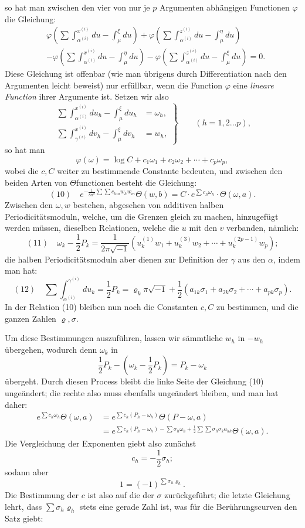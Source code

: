 \documentclass[10pt]{article}
\begin{document}
so hat man zwischen den vier von nur je \(p\) Argumenten abhängigen Functionen \(\varphi\) die Gleichung:
\[
\begin{aligned}
&\varphi\!\left(\sum\int_{\alpha^{(i)}}^{x^{(i)}}du-\int_{\mu}^{\xi}du\right)
+\varphi\!\left(\sum\int_{\alpha^{(i)}}^{z^{(i)}}du-\int_{\mu}^{\eta}du\right)\\
&-\varphi\!\left(\sum\int_{\alpha^{(i)}}^{x^{(i)}}du-\int_{\mu}^{\eta}du\right)
-\varphi\!\left(\sum\int_{\alpha^{(i)}}^{z^{(i)}}du-\int_{\mu}^{\xi}du\right)=0.
\end{aligned}
\]
Diese Gleichung ist offenbar (wie man übrigens durch Differentiation nach den Argumenten leicht beweist) nur erfüllbar, wenn die Function \(\varphi\) eine \emph{lineare Function} ihrer Argumente ist. Setzen wir also
\[
\left.
\begin{aligned}
\sum\int_{\alpha^{(i)}}^{x^{(i)}}du_h-\int_{\mu}^{\xi}du_h&=\omega_h,\\
\sum\int_{\gamma^{(i)}}^{x^{(i)}}dv_h-\int_{\mu}^{\xi}dv_h&=w_h,
\end{aligned}
\right\}
\qquad (h=1,2\ldots p),
\]
so hat man
\[
\varphi(\omega)=\log C+c_1\omega_1+c_2\omega_2+\cdots+c_p\omega_p,
\]
wobei die \(c,C\) weiter zu bestimmende Constante bedeuten, und zwischen den beiden Arten von \(\Theta\)functionen besteht die Gleichung:
\[
(10)\quad
e^{-\frac{1}{8\pi^2}\sum\sum c_{hm}w_hw_m}
\Theta(w,b)=C\cdot e^{\sum c_h\omega_h}\cdot\Theta(\omega,a).
\]
Zwischen den \(\omega,w\) bestehen, abgesehen von additiven halben Periodicitätsmoduln, welche, um die Grenzen gleich zu machen, hinzugefügt werden müssen, dieselben Relationen, welche die \(u\) mit den \(v\) verbanden, nämlich:
\[
(11)\quad
\omega_k-\frac12P_k
=
\frac{1}{2\pi\sqrt{-1}}
\left(u_k^{(1)}w_1+u_k^{(3)}w_2+\cdots+u_k^{(2p-1)}w_p\right);
\]
die halben Periodicitätsmoduln aber dienen zur Definition der \(\gamma\) aus den \(\alpha\), indem man hat:
\[
(12)\quad
\sum\int_{\alpha^{(i)}}^{\gamma^{(i)}}du_k
=\frac12P_k
=\varrho_k\pi\sqrt{-1}
+\frac12(a_{1k}\sigma_1+a_{2k}\sigma_2+\cdots+a_{pk}\sigma_p).
\]
In der Relation (10) bleiben nun noch die Constanten \(c,C\) zu bestimmen, und die ganzen Zahlen \(\varrho,\sigma\).

Um diese Bestimmungen auszuführen, lassen wir sämmtliche \(w_h\) in \(-w_h\) übergehen, wodurch denn \(\omega_k\) in
\[
\frac12P_k-\left(\omega_k-\frac12P_k\right)=P_k-\omega_k
\]
übergeht. Durch diesen Process bleibt die linke Seite der Gleichung (10) ungeändert; die rechte also muss ebenfalls ungeändert bleiben, und man hat daher:
\[
\begin{aligned}
e^{\sum c_h\omega_h}\Theta(\omega,a)
&=e^{\sum c_h(P_h-\omega_h)}\Theta(P-\omega,a)\\
&=e^{\sum c_h(P_h-\omega_h)-\sum\sigma_h\omega_h+\frac12\sum\sum\sigma_h\sigma_ka_{hk}}\Theta(\omega,a).
\end{aligned}
\]
Die Vergleichung der Exponenten giebt also zunächst
\[
c_h=-\frac12\sigma_h;
\]
sodann aber
\[
1=(-1)^{\sum\sigma_h\varrho_h}.
\]
Die Bestimmung der \(c\) ist also auf die der \(\sigma\) zurückgeführt; die letzte Gleichung lehrt, dass \(\sum\sigma_h\varrho_h\) stets eine gerade Zahl ist, was für die Berührungscurven den Satz giebt:
\end{document}
